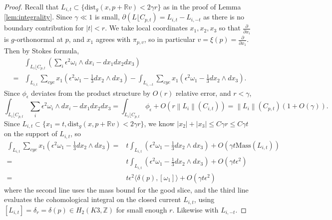 \documentclass{article}
\theoremstyle{definition}
\newcommand{\R}{\mathbb{R}}
\newcommand{\Z}{\mathbb{Z}}
\newcommand{\norm}[1]{\left\lVert#1\right\rVert}
\begin{document}
\begin{proof}
			Recall that $L_{i,t}\subset   \{   \text{dist}_g(x, p+ \R v) <2 \gamma r   \}   $ as in the proof of Lemma \ref{lem:integrality}. Since $\gamma \ll 1$ is small, $\partial ( L\lfloor C_{p,t} )= L_{i,t}- L_{i,-t}$ as there is no boundary contribution for $|t|<r$. We take local coordinates $x_1, x_2, x_3$ so that $\frac{\partial}{\partial x_i}$ is $g$-orthonormal at $p$, and $x_1$ agrees with $\pi_{p,v}$, so in particular $v= \xi(p)= \frac{\partial}{\partial x_1}$. 
			Then by Stokes formula,
			\begin{equation}
				\begin{split}
					&	\int_{L_i  \lfloor C_{p,t} }(\sum_i \epsilon^2 \omega_i \wedge dx_i - dx_1dx_2dx_3)
					\\
					= & \int_{L_{i,t}} \sum_{cyc}  x_1(\epsilon^2\omega_1- \frac{1}{3}dx_2\wedge dx_3) -   \int_{L_{i,-t}} \sum_{cyc}  x_1(\epsilon^2\omega_1- \frac{1}{3}dx_2\wedge dx_3) .
				\end{split}
			\end{equation}
			Since $\phi_\epsilon$ deviates from the product structure by $O(r)$ relative error, and $r<\gamma$,
			\[
				\int_{L_i   \lfloor C_{p,t}   } \sum_i \epsilon^2\omega_i \wedge dx_i - dx_1dx_2dx_3= \int_{L_i   \lfloor C_{p,t}   } \phi_\epsilon +O(r\norm{L_i}(  C_{i,t}   ) )= \norm{L_i}(  C_{p,t}   ) (1+O(\gamma)).
			\]
			Since $L_{i,t}\subset   \{   x_1=t,  \text{dist}_g(x, p+ \R v) <2 \gamma r   \}   $, we know $|x_2|+ |x_3| \leq C\gamma r \leq C\gamma t$ on the support of $L_{i,t}$, so
			\[
			\begin{split}
					\int_{L_{i,t}} \sum_{cyc}  x_1(\epsilon^2 \omega_1- \frac{1}{3} dx_2\wedge dx_3) =&  t	\int_{L_{i,t}}  (\epsilon^2 \omega_1- \frac{1}{3} dx_2\wedge dx_3)  + O(\gamma  t \text{Mass}   (  {L_{i,t}} )  )
					\\
					=&  t	\int_{L_{i,t}}  (\epsilon^2 \omega_1- \frac{1}{3} dx_2\wedge dx_3)  + O(\gamma  t \epsilon^2 )
					\\
					= & t \epsilon^2 \langle \delta(p) , [\omega_1] \rangle + O(\gamma  t \epsilon^2 )
			\end{split}
			\]
			where the second line uses the mass bound for the good slice, and the third line evaluates the cohomological integral on the closed current $L_{i,t}$, using $[L_{i,t}]= \delta_r=\delta(p)\in H_2(K3,\Z)$ for small enough $r$. Likewise with $L_{i,-t}$.
			
			
			

\end{proof}
\end{document}

